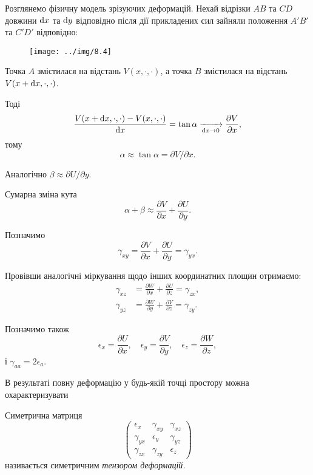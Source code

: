 \begin{enumerate}
	Розглянемо фізичну модель зрізуючих деформацій. Нехай відрізки $AB$ та $CD$ довжини $\mathop{}\!\mathrm{d} x$ та $\mathop{}\!\mathrm{d} y$  відповідно після дії прикладених сил зайняли положення $A' B'$ та $C' D'$ відповідно:
	\begin{figure}[H]
		\centering
		\texttt{[image: ../img/8.4]}
	\end{figure}

	Точка $A$ змістилася на відстань $V(x, \cdot, \cdot)$, а точка $B$ змістилася на відстань $V(x + \mathop{}\!\mathrm{d} x, \cdot, \cdot)$. \medskip

	Тоді
	\begin{equation}
		\frac{V(x + \mathop{}\!\mathrm{d} x, \cdot, \cdot) -V(x, \cdot, \cdot)}{\mathop{}\!\mathrm{d} x} = \tan \alpha \xrightarrow[\mathop{}\!\mathrm{d} x \to 0]{} \frac{\partial V}{\partial x},
	\end{equation}
	тому
	\begin{equation}
		\alpha \approx \tan \alpha = \partial V / \partial x.
	\end{equation}

	Аналогічно $\beta \approx \partial U / \partial y$. \medskip

	Сумарна зміна кута
	\begin{equation}
		\alpha + \beta \approx \frac{\partial V}{\partial x} + \frac{\partial U}{\partial y}.
	\end{equation}
	
	Позначимо
	\begin{equation}
		\gamma_{x y} = \frac{\partial V}{\partial x} + \frac{\partial U}{\partial y} = \gamma_{y x}.
	\end{equation}
	
	Провівши аналогічні міркування щодо інших координатних площин отримаємо: 
	\begin{align}
		\gamma_{x z} &= \frac{\partial W}{\partial x} + \frac{\partial U}{\partial z} = \gamma_{z x}, \\
		\gamma_{y z} &= \frac{\partial W}{\partial y} + \frac{\partial V}{\partial z} = \gamma_{z y}.
	\end{align}

	Позначимо також
	\begin{equation}
		\epsilon_x = \frac{\partial U}{\partial x}, \quad \epsilon_y = \frac{\partial V}{\partial y}, \quad \epsilon_z = \frac{\partial W}{\partial z},
	\end{equation}
	і $\gamma_{a a} = 2 \epsilon_a$. \medskip

	В результаті повну деформацію у будь-якій точці простору можна охарактеризувати 
	\begin{definition}
		Симетрична матриця
		\begin{equation}
			\begin{pmatrix}
				\epsilon_x & \gamma_{x y} & \gamma_{x z} \\
				\gamma_{y x} & \epsilon_y & \gamma_{y z} \\
				\gamma_{z x} & \gamma_{z y} & \epsilon_z
			\end{pmatrix}
		\end{equation}
		називається симетричним \it{тензором деформацій}.
	\end{definition}
\end{enumerate}

